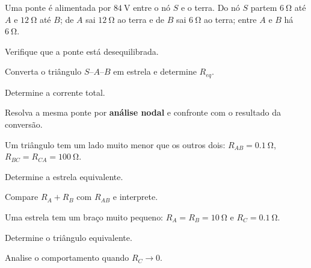 \blocoaprofundamento
\begin{questao}[3]{}

Uma ponte é alimentada por $\SI{84}{\volt}$ entre o nó $S$ e o terra. Do nó
$S$ partem $\SI{6}{\ohm}$ até $A$ e $\SI{12}{\ohm}$ até $B$; de $A$ sai
$\SI{12}{\ohm}$ ao terra e de $B$ sai $\SI{6}{\ohm}$ ao terra; entre $A$ e
$B$ há $\SI{6}{\ohm}$.
\begin{itensq}
\item Verifique que a ponte está desequilibrada.
\item Converta o triângulo $S$--$A$--$B$ em estrela e determine $R_{eq}$.
\item Determine a corrente total.
\end{itensq}


\end{questao}
\begin{questao}[3]{}

Resolva a mesma ponte por \textbf{análise nodal} e confronte com o resultado da
conversão.


\end{questao}
\begin{questao}[3]{}

Um triângulo tem um lado muito menor que os outros dois:
$R_{AB}=\SI{0.1}{\ohm}$, $R_{BC}=R_{CA}=\SI{100}{\ohm}$.
\begin{itensq}
\item Determine a estrela equivalente.
\item Compare $R_A+R_B$ com $R_{AB}$ e interprete.
\end{itensq}


\end{questao}
\begin{questao}[3]{}

Uma estrela tem um braço muito pequeno: $R_A=R_B=\SI{10}{\ohm}$ e
$R_C=\SI{0.1}{\ohm}$.
\begin{itensq}
\item Determine o triângulo equivalente.
\item Analise o comportamento quando $R_C\to0$.
\end{itensq}


\end{questao}
